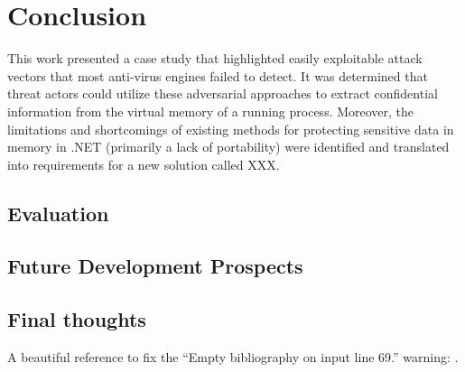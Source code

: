 \chapter{Conclusion}
\label{ch:conclusion}

This work presented a case study that highlighted easily exploitable attack vectors that most anti-virus engines failed to detect. It was determined that threat actors could utilize these adversarial approaches to extract confidential information from the virtual memory of a running process. Moreover, the limitations and shortcomings of existing methods for protecting sensitive data in memory in .NET (primarily a lack of portability) were identified and translated into requirements for a new solution called XXX. 

\section{Evaluation}

\lorizzlelong

\section{Future Development Prospects}
\label{sec:outlook}



\lorizzleshort

\lorizzleshort

\section{Final thoughts}

\lorizzle

A beautiful reference to fix the \enquote{Empty bibliography on input line 69.} warning: \cite{CiscoBlogsMemoryDumping}. 